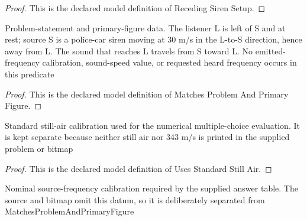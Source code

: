 \begin{proof}
  This is the declared model definition of Receding Siren Setup.
\end{proof}
\begin{definition}
  \label{def:physics:phyx-mini-0194:phyxminiproblems-problemphyxmini0194-matchesproblemandprimaryfigure}
  Problem-statement and primary-figure data. The listener L is left of S and at rest; source S is a police-car siren moving at 30 m/s in the L-to-S direction, hence away from L. The sound that reaches L travels from S toward L. No emitted-frequency calibration, sound-speed value, or requested heard frequency occurs in this predicate
\end{definition}
\begin{proof}
  This is the declared model definition of Matches Problem And Primary Figure.
\end{proof}
\begin{definition}
  \label{def:physics:phyx-mini-0194:phyxminiproblems-problemphyxmini0194-usesstandardstillair}
  Standard still-air calibration used for the numerical multiple-choice evaluation. It is kept separate because neither still air nor 343 m/s is printed in the supplied problem or bitmap
\end{definition}
\begin{proof}
  This is the declared model definition of Uses Standard Still Air.
\end{proof}
\begin{definition}
  \label{def:physics:phyx-mini-0194:phyxminiproblems-problemphyxmini0194-usesnominalsirenemission}
  Nominal source-frequency calibration required by the supplied answer table. The source and bitmap omit this datum, so it is deliberately separated from MatchesProblemAndPrimaryFigure
\end{definition}
